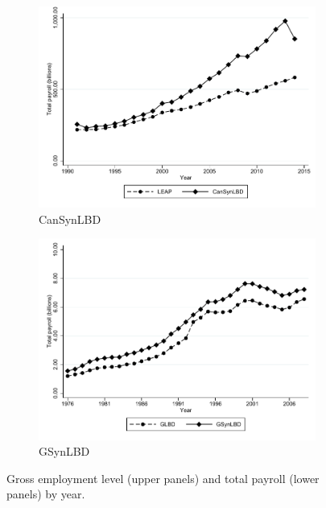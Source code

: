 \begin{figure}[t]
\begin{subfigure}[h]{0.48\linewidth}
    \includegraphics[trim=0 0 0 -20,clip,width=\linewidth]{graphs/Total_payroll_by_year_private_bw.pdf}
   \caption{CanSynLBD}
   \end{subfigure}
\hfill
   \begin{subfigure}[h]{0.48\linewidth}
     \includegraphics[trim=0 0 0 -20,clip,width=\linewidth]{graphs/Total_payroll_by_year_bw_GsynLBD.pdf}
     \caption{GSynLBD}
   \end{subfigure}%
   \caption{Gross employment level (upper panels) and total payroll (lower panels) by year.}\label{fig:entity_chracteristics}
\end{figure}
